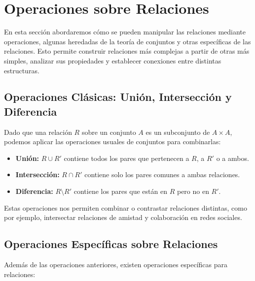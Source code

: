 


\section{Operaciones sobre Relaciones}

En esta secci\'on abordaremos c\'omo se pueden manipular las relaciones mediante operaciones, algunas heredadas de la teor\'ia de conjuntos y otras espec\'ificas de las relaciones. Esto permite construir relaciones m\'as complejas a partir de otras m\'as simples, analizar sus propiedades y establecer conexiones entre distintas estructuras.

\subsection{Operaciones Cl\'asicas: Uni\'on, Intersecci\'on y Diferencia}

Dado que una relaci\'on $R$ sobre un conjunto $A$ es un subconjunto de $A \times A$, podemos aplicar las operaciones usuales de conjuntos para combinarlas:

\begin{itemize}
  \item \textbf{Uni\'on:} $R \cup R'$ contiene todos los pares que pertenecen a $R$, a $R'$ o a ambos.
  \item \textbf{Intersecci\'on:} $R \cap R'$ contiene solo los pares comunes a ambas relaciones.
  \item \textbf{Diferencia:} $R \setminus R'$ contiene los pares que est\'an en $R$ pero no en $R'$.
\end{itemize}

Estas operaciones nos permiten combinar o contrastar relaciones distintas, como por ejemplo, intersectar relaciones de amistad y colaboraci\'on en redes sociales.


%
\subsection{Operaciones Espec\'ificas sobre Relaciones}

Adem\'as de las operaciones anteriores, existen operaciones espec\'ificas para relaciones:

